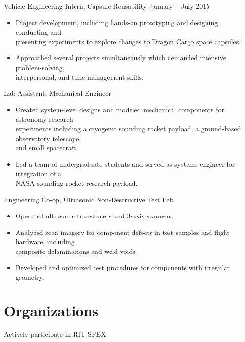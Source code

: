 \documentclass[10pt,final,sans]{resume}
\begin{document}
Vehicle Engineering Intern, Capsule Reusability \hfill January -- July 2015
\begin{itemize}
  \item Project development, including hands-on prototyping and designing, conducting and \\
  presenting experiments to explore changes to Dragon Cargo space capsules.
  \item Approached several projects simultaneously which demanded intensive problem-solving, \\
  interpersonal, and time management skills.
\end{itemize}

Lab Assistant, Mechanical Engineer
\begin{itemize}
  \item Created system-level designs and modeled mechanical components for astronomy research \\ 
  experiments including a cryogenic sounding rocket payload, a ground-based observatory telescope, \\
  and small spacecraft.
  \item Led a team of undergraduate students and served as systems engineer for integration of a \\
  NASA sounding rocket research payload.
\end{itemize}
Engineering Co-op, Ultrasonic Non-Destructive Test Lab
\begin{itemize}
  \item Operated ultrasonic transducers and 3-axis scanners.
  \item Analyzed scan imagery for component defects in test samples and flight hardware, including \\
  composite delaminations and weld voids.
  \item Developed and optimized test procedures for components with irregular geometry.
\end{itemize}

\section{Organizations}
Actively participate in RIT SPEX
\end{document}
